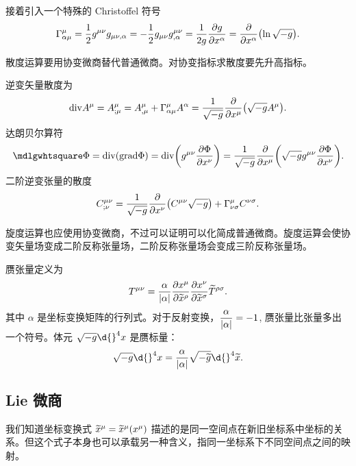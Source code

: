 \documentclass[UTF8, 12pt, a4paper, oneside, onecolumn, fontset=none]{ctexart}
\begin{document}
接着引入一个特殊的 Christoffel 符号
\begin{equation}
\Gamma_{\alpha\mu}^{\mu}=\frac{1}{2}g^{\mu\nu}g_{\mu\nu,\alpha}=-\frac{1}{2}g_{\mu\nu}g^{\mu\nu}_{,\alpha}=\frac{1}{2g}\frac{\partial{}g}{\partial{}x^{\alpha}}=\frac{\partial{}}{\partial{}x^{\alpha}}\mleft(\ln\sqrt{-g}\mright).\label{1.10.6}
\end{equation}

散度运算要用协变微商替代普通微商。对协变指标求散度要先升高指标。

逆变矢量散度为
\begin{equation}
\mathrm{div}A^{\mu}=A^{\mu}_{;\mu}=A^{\mu}_{,\mu}+\Gamma^{\mu}_{\alpha\mu}A^{\alpha}=\frac{1}{\sqrt{-g}}\frac{\partial{}}{\partial{}x^{\mu}}\mleft(\sqrt{-g}A^{\mu}\mright).
\end{equation}
达朗贝尔算符
\begin{equation}
\mdlgwhtsquare\Phi=\mathrm{div}\mleft(\mathrm{grad}\Phi\mright)=\mathrm{div}\mleft(g^{\mu\nu}\frac{\partial\Phi}{\partial{}x^{\nu}}\mright)=\frac{1}{\sqrt{-g}}\frac{\partial{}}{\partial{}x^{\mu}}\mleft(\sqrt{-g}g^{\mu\nu}\frac{\partial\Phi}{\partial{}x^{\nu}}\mright).
\end{equation}
二阶逆变张量的散度
\begin{equation}
C^{\mu\nu}_{;\nu}=\frac{1}{\sqrt{-g}}\frac{\partial{}}{\partial{}x^{\nu}}\mleft(C^{\mu\nu}\sqrt{-g}\mright)+\Gamma_{\nu\sigma}^{\mu}C^{\nu\sigma}.
\end{equation}

旋度运算也应使用协变微商，不过可以证明可以化简成普通微商。旋度运算会使协变矢量场变成二阶反称张量场，二阶反称张量场会变成三阶反称张量场。

赝张量定义为
\begin{equation}
T^{\mu\nu}=\frac{\alpha}{\mleft\vert\alpha\mright\vert{}}\frac{\partial{}x^{\mu}}{\partial\widetilde{x}^{\rho}}\frac{\partial{}x^{\nu}}{\partial\widetilde{x}^{\sigma}}\widetilde{T}^{\rho\sigma}.
\end{equation}
其中 $\alpha$ 是坐标变换矩阵的行列式。对于反射变换，$\dfrac{\alpha}{\mleft\vert\alpha\mright\vert{}}=-1$, 赝张量比张量多出一个符号。体元 $\sqrt{-g}\d{}^{4}x$ 是赝标量：
\begin{equation}
\sqrt{-g}\d{}^{4}x=\frac{\alpha}{\mleft\vert\alpha\mright\vert{}}\sqrt{-\widetilde{g}}\d{}^{4}\widetilde{x}.
\end{equation}

\subsection{Lie 微商}
我们知道坐标变换式 $\widetilde{x}^{\mu}=\widetilde{x}^{\mu}\mleft(x^{\mu}\mright)$ 描述的是同一空间点在新旧坐标系中坐标的关系。但这个式子本身也可以承载另一种含义，指同一坐标系下不同空间点之间的映射。
\end{document}
